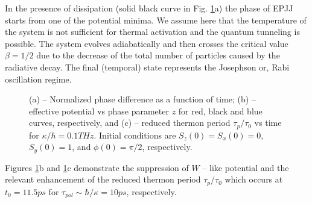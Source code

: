 \documentclass[fleqn,10pt]{wlscirep}
\begin{document}
In the presence of dissipation (solid black curve in Fig. \ref{pic:phase}a) the phase of EPJJ starts from one of the potential minima.
We assume here that the temperature of the system is not sufficient for thermal activation and the quantum tunneling is possible. The system evolves adiabatically and then  crosses the critical value $\beta = 1/2$
due to the decrease of the total number of particles caused by the radiative decay.
The final (temporal) state represents the Josephson or, Rabi oscillation regime.
%
\begin{figure}[ht]
\caption{(a) -- Normalized phase difference as a function of time; (b) -- effective potential vs phase parameter $z$ for red, black and blue curves, respectively, and (c) -- reduced thermon period $\tau_{p} / \tau_0$  vs time for $\kappa/\hbar = 0.1 THz$. 
Initial conditions are $S_z(0) = S_x(0) = 0$, $S_y(0) = 1$, and $\phi(0) = \pi / 2$, respectively.
\label{pic:phase}}
\end{figure}
%

Figures \ref{pic:phase}b and \ref{pic:phase}c demonstrate the suppression of $W$ -- like potential and the relevant enhancement of the reduced thermon period $\tau_{p} / \tau_0$ which occurs at $t_0 = 11.5 ps$ for  $\tau_{pol} \sim \hbar/\kappa= 10 ps$, respectively.
\end{document}
